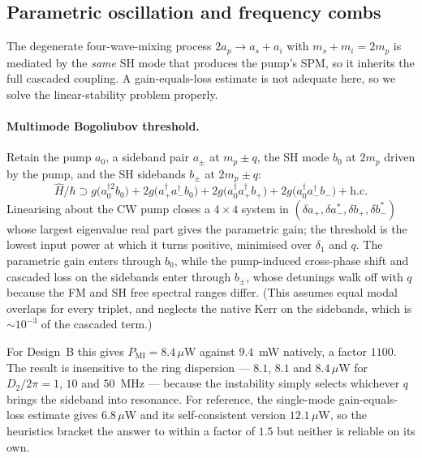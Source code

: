\documentclass[11pt,a4paper]{article}
\begin{document}
\subsection{Parametric oscillation and frequency combs}\label{sec:comb}

The degenerate four-wave-mixing process $2a_p\to a_s+a_i$ with
$m_s+m_i=2m_p$ is mediated by the \emph{same} SH mode that produces the
pump's SPM, so it inherits the full cascaded coupling.  A
gain-equals-loss estimate is not adequate here, so we solve the
linear-stability problem properly.

\paragraph{Multimode Bogoliubov threshold.}  Retain the pump $a_0$, a
sideband pair $a_\pm$ at $m_p\pm q$, the SH mode $b_0$ at $2m_p$ driven
by the pump, and the SH sidebands $b_\pm$ at $2m_p\pm q$:
\begin{equation}
  \hat H/\hbar\supset g\bigl(a_0^{\dagger2}b_0\bigr)
   +2g\bigl(a_+^\dagger a_-^\dagger b_0\bigr)
   +2g\bigl(a_0^\dagger a_+^\dagger b_+\bigr)
   +2g\bigl(a_0^\dagger a_-^\dagger b_-\bigr)+\text{h.c.}
\end{equation}
Linearising about the CW pump closes a $4\times4$ system in
$(\delta a_+,\delta a_-^*,\delta b_+,\delta b_-^*)$ whose largest
eigenvalue real part gives the parametric gain; the threshold is the
lowest input power at which it turns positive, minimised over $\delta_1$
and $q$.  The parametric gain enters through $b_0$, while the
pump-induced cross-phase shift and cascaded loss on the sidebands enter
through $b_\pm$, whose detunings walk off with $q$ because the FM and SH
free spectral ranges differ.  (This assumes equal modal overlaps for
every triplet, and neglects the native Kerr on the sidebands, which is
$\sim10^{-3}$ of the cascaded term.)

For Design~B this gives $P_{\text{MI}}=8.4\,\mu$W against $9.4$~mW
natively, a factor $1100$.  The result is insensitive to the ring
dispersion --- $8.1$, $8.1$ and $8.4\,\mu$W for
$D_2/2\pi=1$, $10$ and $50$~MHz --- because the instability simply
selects whichever $q$ brings the sideband into resonance.  For reference,
the single-mode gain-equals-loss estimate gives $6.8\,\mu$W and its
self-consistent version $12.1\,\mu$W, so the heuristics bracket the
answer to within a factor of $1.5$ but neither is reliable on its own.
\end{document}
